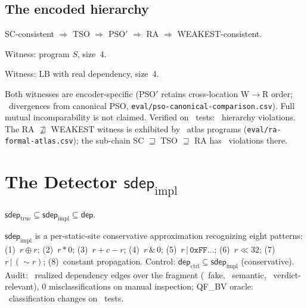 \documentclass{llncs}
\newcommand{\dep}{\mathsf{dep}}
\newcommand{\sdepimpl}{\mathsf{sdep}_{\mathrm{impl}}}
\newcommand{\sdeptrue}{\mathsf{sdep}_{\mathrm{true}}}
\begin{document}
\subsection{The encoded hierarchy}
\label{sec:hierarchy}
\label{sec:hierarchy-corollary}

\begin{theorem}[SC dominance]
\label{thm:hierarchy}
SC-consistent $\Rightarrow$ TSO $\Rightarrow$ PSO$'$ $\Rightarrow$ RA $\Rightarrow$ WEAKEST-consistent.
\end{theorem}

\begin{proposition}
\label{prop:tso-pso}
Witness: program $S$, size~4.
\end{proposition}

\begin{proposition}
\label{prop:ra-weakest}
Witness: LB with real dependency, size~4.
\end{proposition}

\noindent Both witnesses are encoder-specific (PSO$'$ retains cross-location
W$\to$R order; \PsoCanonicalDivergences~divergences from canonical PSO,
\texttt{eval/pso-canonical-comparison.csv}). Full mutual incomparability is
not claimed. Verified on \CorpusSize~tests: \HierarchyViolations~hierarchy violations.
The RA $\not\sqsupseteq$ WEAKEST witness is exhibited by \AtlasRaWeakestWitnesses~atlas
programs (\texttt{eval/ra-formal-atlas.csv}); the sub-chain
SC $\sqsupseteq$ TSO $\sqsupseteq$ RA has \AtlasSubchainViolations~violations there.

\section{The Detector \texorpdfstring{$\sdepimpl$}{sdep\_impl}}
\label{sec:detector}

\begin{lemma}
\label{lem:detector-soundness}
$\sdeptrue \subseteq \sdepimpl \subseteq \dep$.
\end{lemma}

$\sdepimpl$ is a per-static-site conservative approximation recognizing eight patterns:
(1)~$r \oplus r$; (2)~$r*0$; (3)~$r+c-r$; (4)~$r\,\&\,0$; (5)~$r\,|\,\texttt{0xFF\ldots}$;
(6)~$r \ll 32$; (7)~$r\,|\,(\sim r)$; (8)~constant propagation.
Control: $\dep_{\mathrm{ctrl}} \subseteq \sdepimpl$ (conservative).
Audit: \DetectorEdges~realized dependency edges over the fragment
(\DetectorFakeEdges~fake, \DetectorSemanticEdges~semantic,
\DetectorRelevantEdges~verdict-relevant), 0 misclassifications on manual
inspection; QF\_BV oracle: \QfbvChanged~classification changes on \QfbvTests~tests.
\end{document}
